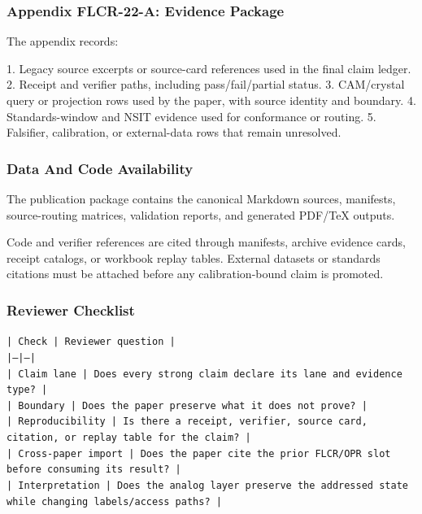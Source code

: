 \documentclass[11pt]{article}
\begin{document}
\subsubsection*{Appendix FLCR-22-A: Evidence Package}

The appendix records:

1. Legacy source excerpts or source-card references used in the final claim ledger.
2. Receipt and verifier paths, including pass/fail/partial status.
3. CAM/crystal query or projection rows used by the paper, with source identity and boundary.
4. Standards-window and NSIT evidence used for conformance or routing.
5. Falsifier, calibration, or external-data rows that remain unresolved.

\subsubsection*{Data And Code Availability}

The publication package contains the canonical Markdown sources, manifests, source-routing matrices, validation reports, and generated PDF/TeX outputs.

Code and verifier references are cited through manifests, archive evidence cards, receipt catalogs, or workbook replay tables. External datasets or
standards citations must be attached before any calibration-bound claim is
promoted.

\subsubsection*{Reviewer Checklist}

\noindent\texttt{| Check | Reviewer question |}\\
\noindent\texttt{|---|---|}\\
\noindent\texttt{| Claim lane | Does every strong claim declare its lane and evidence type? |}\\
\noindent\texttt{| Boundary | Does the paper preserve what it does not prove? |}\\
\noindent\texttt{| Reproducibility | Is there a receipt, verifier, source card, citation, or replay table for the claim? |}\\
\noindent\texttt{| Cross-paper import | Does the paper cite the prior FLCR/OPR slot before consuming its result? |}\\
\noindent\texttt{| Interpretation | Does the analog layer preserve the addressed state while changing labels/access paths? |}\\
\end{document}
